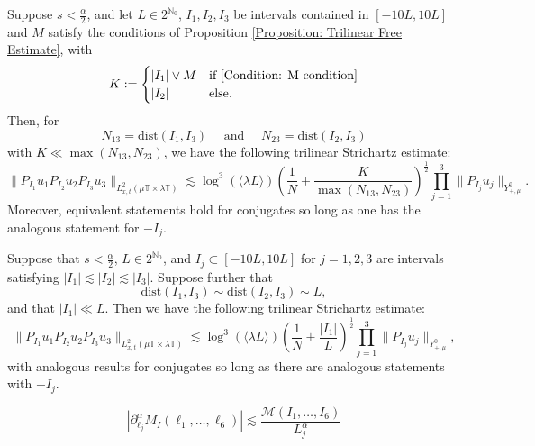 \documentclass[10pt,a4paper]{amsart}
\newcommand{\cal}[1]{\mathcal{#1}}
\begin{document}
\begin{proposition}\label{Lemma: trilinear Estimates}
    Suppose $s < \frac{\alpha}{2}$, and let $L\in 2^{\mathbb{N}_0}$, $I_1, I_2, I_3$ be intervals contained in $[-10L, 10L]$ and $M$ satisfy the conditions of Proposition \ref{Proposition: Trilinear Free Estimate}, with
    \[
    K := 
\begin{cases}
    |I_1|\vee M & \mbox{if }\eqref{Condition: M condition}\\
    |I_2| &\mbox{else}.
\end{cases}
    \]
    Then, for
    \[
    N_{13} = \mathrm{dist}(I_1, I_3)\quad\mbox{ and }\quad N_{23} = \mathrm{dist}(I_2, I_3)
    \]
    with $K\ll \max(N_{13}, N_{23})$, we have the following trilinear Strichartz estimate:
    \[
    \|P_{I_1}u_1P_{I_2}u_2P_{I_3}u_3\|_{L^2_{x,t}(\mu\mathbb{T}\times\lambda\mathbb{T})}\lesssim \log^3(\langle \lambda L\rangle)\left(\frac{1}{N}+\frac{K}{\max(N_{13}, N_{23})}\right)^\frac{1}{2}\prod_{j=1}^3\|P_{I_j}u_j\|_{Y^0_{+,\mu}}.
    \]
    Moreover, equivalent statements hold for conjugates so long as one has the analogous statement for $-I_j$.
\end{proposition}

\begin{corollary}\label{Corollary: Trilinear Strichartz Specific}
    Suppose that $s < \tfrac{\alpha}{2}$, $L\in 2^{\mathbb{N}_0}$, and $I_j\subset [-10L, 10L]$ for $j = 1, 2,3$ are intervals satisfying $|I_1|\lesssim |I_2|\lesssim |I_3|$. Suppose further that
    \[
    \mathrm{dist}(I_1, I_3)\sim \mathrm{dist}(I_2, I_3)\sim L,
    \]
    and that $|I_1|\ll L$. Then we have the following trilinear Strichartz estimate:
    \[
    \|P_{I_1}u_1P_{I_2}u_2P_{I_3}u_3\|_{L^2_{x,t}(\mu\mathbb{T}\times\lambda\mathbb{T})}\lesssim \log^3(\langle \lambda L\rangle)\left(\frac{1}{N}+\frac{|I_1|}{L}\right)^\frac{1}{2}\prod_{j=1}^3\|P_{I_j}u_j\|_{Y^0_{+,\mu}},
    \]
    with analogous results for conjugates so long as there are analogous statements with $-I_j$.
\end{corollary}

    \begin{equation}\label{Equation: Regularity}
        |\partial_{\ell_j}^\alpha \overline{M}_I(\ell_1,\dots,\ell_6)|\lesssim \frac{\cal{M}(I_1,\dots,I_6)}{L^\alpha_j}
    \end{equation}
\end{document}
